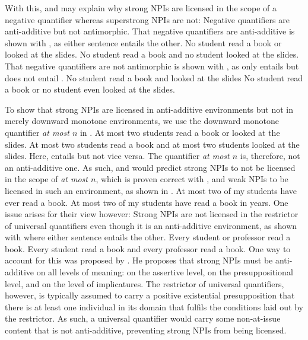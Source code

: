 With this, \textcite{Zwarts1998} and \textcite{Wouden1997} may explain why strong NPIs are licensed in the scope of a negative quantifier whereas superstrong NPIs are not: Negative quantifiers are anti-additive but not antimorphic. That negative quantifiers are anti-additive is shown with , as either sentence entails the other.
\pex[nopreamble=true]\label{ex:aa-no}%
\a{} No student read a book or looked at the slides.
\a{} No student read a book and no student looked at the slides.
\xe
That negative quantifiers are not antimorphic is shown with , as only  entails  but  does not entail .
\pex[nopreamble=true]\label{ex:am-no}%
\a{} No student read a book and looked at the slides
\a{} No student read a book or no student even looked at the slides.
\xe

To show that strong NPIs are licensed in anti-additive environments but not in merely downward monotone environments, we use the downward monotone quantifier \textit{at most $n$} in .
\pex[nopreamble=true]\label{ex:aa-atmost}%
\a{} At most two students read a book or looked at the slides.
\a{} At most two students read a book and at most two students looked at the slides.
\xe
Here,  entails  but not vice versa. The quantifier \textit{at most $n$} is, therefore, not an anti-additive one. As such, \textcite{Zwarts1998} and \textcite{Wouden1997} would predict strong NPIs to not be licensed in the scope of \textit{at most $n$}, which is proven correct with , and weak NPIs to be licensed in such an environment, as shown in .
\pex[nopreamble=true]\label{ex:npi-atmost}%
\a{} At most two of my students have ever read a book.
\a{} \ljudge{\#}At most two of my students have read a book in years.
\xe
One issue arises for their view however: Strong NPIs are not licensed in the restrictor of universal quantifiers even though it is an anti-additive environment, as shown with  where either sentence entails the other.
\pex[nopreamble=true]\label{ex:aa-every}%
\a{} Every student or professor read a book.
\a{} Every student read a book and every professor read a book.
\xe
One way to account for this was proposed by \textcite{Gajewski2011}. He proposes that strong NPIs must be anti-additive on all levels of meaning: on the assertive level, on the presuppositional level, and on the level of implicatures. The restrictor of universal quantifiers, however, is typically assumed to carry a positive existential presupposition that there is at least one individual in its domain that fulfils the conditions laid out by the restrictor. As such, a universal quantifier would carry some non-at-issue content that is not anti-additive, preventing strong NPIs from being licensed.

